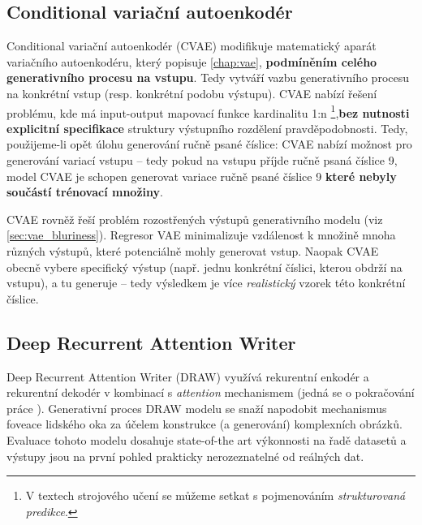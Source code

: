 \subsection{Conditional variační autoenkodér}
\label{sec:cvae}
Conditional variační autoenkodér (CVAE) \cite{Sohn2015} modifikuje matematický aparát variačního autoenkodéru, který popisuje \autoref{chap:vae}, \textbf{podmíněním celého generativního procesu na vstupu}. Tedy vytváří vazbu generativního procesu na konkrétní vstup (resp. konkrétní podobu výstupu).
CVAE nabízí řešení problému, kde má input-output mapovací funkce kardinalitu 1:n
\footnote{V textech strojového učení se můžeme setkat s pojmenováním \emph{strukturovaná predikce}.},\textbf{bez nutnosti explicitní specifikace} struktury výstupního rozdělení pravděpodobnosti.
Tedy, použijeme-li opět úlohu generování ručně psané číslice: CVAE nabízí možnost pro generování variací vstupu – tedy pokud na vstupu příjde ručně psaná číslice 9, model CVAE je schopen generovat variace ručně psané číslice 9 \textbf{které nebyly součástí trénovací množiny}.

CVAE rovněž řeší problém rozostřených výstupů generativního modelu (viz \autoref{sec:vae_bluriness}). Regresor VAE minimalizuje vzdálenost k množině mnoha různých výstupů, které potenciálně mohly generovat vstup. Naopak CVAE obecně vybere specifický výstup (např. jednu konkrétní číslici, kterou obdrží na vstupu), a tu generuje – tedy výsledkem je více \emph{realistický} vzorek této konkrétní číslice.  
\cite{Doersch2021}

\subsection{Deep Recurrent Attention Writer}
\label{sec:draw}
Deep Recurrent Attention Writer (DRAW) \cite{Gregor2015} využívá rekurentní enkodér a rekurentní dekodér v kombinací s \emph{attention} mechanismem (jedná se o pokračování práce \cite{Gregor2014}).
Generativní proces DRAW modelu se snaží napodobit mechanismus foveace lidského oka za účelem konstrukce (a generování) komplexních obrázků.
Evaluace tohoto modelu dosahuje state-of-the art výkonnosti na řadě datasetů a výstupy jsou na první pohled prakticky nerozeznatelné od reálných dat. \cite{Gregor2015}
